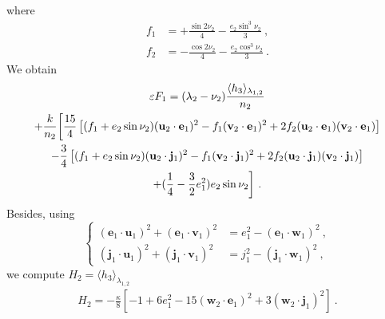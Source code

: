 \documentclass[a4paper]{article}
\begin{document}
where
\begin{align}
f_{1}&=+\frac{\sin{2\nu_{2}}}{4}-\frac{e_{2}\sin^{3}{\nu_{2}}}{3} \ , \\
f_{2}&=-\frac{\cos{2\nu_{2}}}{4}-\frac{e_{2}\cos^{3}{\nu_{2}}}{3} \ .
\end{align}
We obtain
\begin{gather}
\varepsilon F_{1}=(\lambda_{2}-\nu_{2})\frac{ \langle h_{3} \rangle _{\lambda_{1,2}}}{n_{2}}  \notag \\
+\frac{k}{n_{2}}
\biggl[
\frac{15}{4}
\left[ 
(f_{1}+e_ {2}\sin{\nu_{2}})(\mathbf u_{2} \cdot \mathbf e_{1})^{2}-f_{1}(\mathbf v_{2} \cdot \mathbf e_{1})^{2}+2f_{2}(\mathbf u_{2} \cdot \mathbf e_{1})(\mathbf v_{2} \cdot \mathbf e_{1})
\right]  \notag \\
-\frac{3}{4}
\left[
(f_{1}+e_{2}\sin{\nu_{2}})(\mathbf u_{2} \cdot \mathbf j_{1})^{2}-f_{1}(\mathbf v_{2} \cdot \mathbf j_{1})^{2}+2f_{2}(\mathbf u_{2} \cdot \mathbf j_{1})(\mathbf v_{2} \cdot \mathbf j_{1}) 
\right]  \notag \\
+(\frac{1}{4}-\frac{3}{2}e_{1}^{2})e_{2}\sin{\nu_{2}}
\biggr] \ .
\label{f1f}
\end{gather}
Besides, using
\begin{equation}
\begin{cases}
(\mathbf e_{1} \cdot \mathbf u_{1})^{2}+(\mathbf e_{1} \cdot \mathbf v_{1})^{2}&=e_{1}^{2}-(\mathbf e_{1} \cdot \mathbf w_{1})^{2} \ , \\
(\mathbf j_{1} \cdot \mathbf u_{1})^{2}+(\mathbf j_{1} \cdot \mathbf v_{1})^{2}&=j_{1}^{2}-(\mathbf j_{1} \cdot \mathbf w_{1})^{2} \ , 
\end{cases}
\end{equation}
we compute $H_{2}= \langle h_{3} \rangle _{\lambda_{1,2}}$
\begin{gather}
 H_{2}=-\frac{\kappa}{8} \left[ -1+6e_{1}^{2} -15(\mathbf w_{2} \cdot \mathbf e_{1})^{2} +3(\mathbf w_{2} \cdot \mathbf j_{1})^{2} \right] \ .
\label{h32f}
\end{gather}
\end{document}
